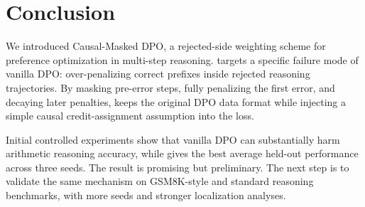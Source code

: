 \section{Conclusion}

We introduced Causal-Masked DPO, a rejected-side weighting scheme for preference optimization in multi-step reasoning. \cmdpo targets a specific failure mode of vanilla DPO: over-penalizing correct prefixes inside rejected reasoning trajectories. By masking pre-error steps, fully penalizing the first error, and decaying later penalties, \cmdpo keeps the original DPO data format while injecting a simple causal credit-assignment assumption into the loss.

Initial controlled experiments show that vanilla DPO can substantially harm arithmetic reasoning accuracy, while \cmdpo gives the best average held-out performance across three seeds. The result is promising but preliminary. The next step is to validate the same mechanism on GSM8K-style and standard reasoning benchmarks, with more seeds and stronger localization analyses.
